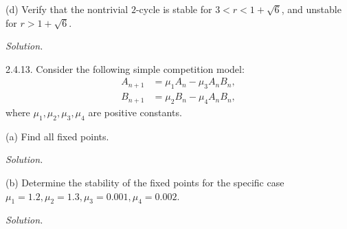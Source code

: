 \documentclass{article}
\begin{document}
(d) Verify that the nontrivial $2$-cycle is stable for $3 < r < 1 +
\sqrt{6}$, and unstable for $r > 1 + \sqrt{6}$.

\textit{Solution.}

\newpage

2.4.13. Consider the following simple competition model:
%
\begin{align*}
    A_{n + 1} &= \mu_1 A_n - \mu_3 A_n B_n, \\
    B_{n + 1} &= \mu_2 B_n - \mu_4 A_n B_n,
\end{align*}
%
where $\mu_1, \mu_2, \mu_3, \mu_4$ are positive constants.

(a) Find all fixed points.

\textit{Solution.}

\vspace{5mm}

(b) Determine the stability of the fixed points for the specific case
$\mu_1 = 1.2, \mu_2 = 1.3, \mu_3 = 0.001, \mu_4 = 0.002$.

\textit{Solution.}
\end{document}
